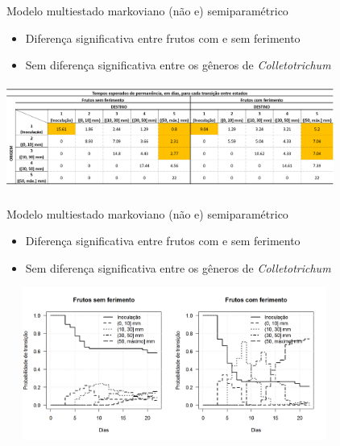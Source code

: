 \begin{frame}

\begin{block}{Modelo multiestado markoviano (não e) semiparamétrico}
 \begin{itemize}
  \item Diferença significativa entre frutos com e sem ferimento
  \item Sem diferença significativa entre os gêneros de
        \textit{Colletotrichum}
 \end{itemize}
\end{block}

\pause

\begin{center}
 \includegraphics*[height = 3.5cm, width = 10.75cm]{ic-table_mstate.png}
\end{center}

\end{frame}

\begin{frame}

\begin{block}{Modelo multiestado markoviano (não e) semiparamétrico}
 \begin{itemize}
  \item Diferença significativa entre frutos com e sem ferimento
  \item Sem diferença significativa entre os gêneros de
        \textit{Colletotrichum}
 \end{itemize}
\end{block}

\vspace{-.7cm}\begin{center}
 \includegraphics*[height = 5cm, width = 11cm]{ic_mstate.png}
\end{center}

\end{frame}

